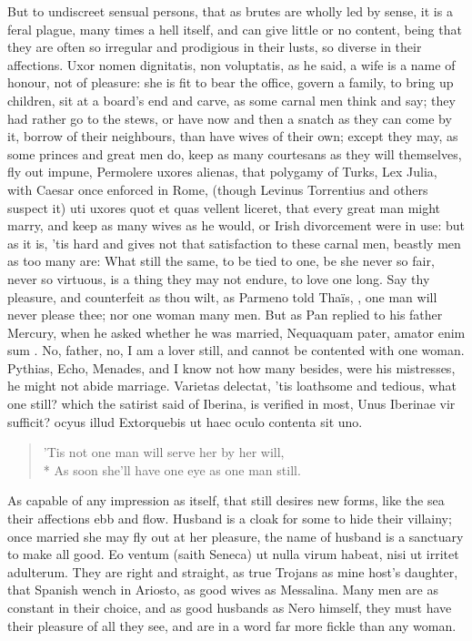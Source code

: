 {But to undiscreet sensual persons, that as brutes are wholly led by
sense, it is a feral plague, many times a hell itself, and can give
little or no content, being that they are often so irregular and
prodigious in their lusts, so diverse in their affections. Uxor nomen
dignitatis, non voluptatis, as he said, a wife is a name of
honour, not of pleasure: she is fit to bear the office, govern a
family, to bring up children, sit at a board's end and carve, as some
carnal men think and say; they had rather go to the stews, or have now
and then a snatch as they can come by it, borrow of their neighbours,
than have wives of their own; except they may, as some princes and
great men do, keep as many courtesans as they will themselves, fly out
impune, Permolere uxores alienas, that polygamy of Turks, Lex
Julia, with Caesar once enforced in Rome, (though Levinus Torrentius
and others suspect it) uti uxores quot et quas vellent liceret, that
every great man might marry, and keep as many wives as he would, or
Irish divorcement were in use: but as it is, 'tis hard and gives not
that satisfaction to these carnal men, beastly men as too many are:
What still the same, to be tied to one, be she never so
fair, never so virtuous, is a thing they may not endure, to love one
long. Say thy pleasure, and counterfeit as thou wilt, as Parmeno
told Thaïs, , one man will never please thee;
nor one woman many men. But as Pan replied to his father Mercury,
when he asked whether he was married, Nequaquam pater, amator enim sum
\etc{}. No, father, no, I am a lover still, and cannot be contented with
one woman. Pythias, Echo, Menades, and I know not how many besides,
were his mistresses, he might not abide marriage. Varietas delectat,
'tis loathsome and tedious, what one still? which the satirist said of
Iberina, is verified in most,
Unus Iberinae vir sufficit? ocyus illud
Extorquebis ut haec oculo contenta sit uno.

\begin{verse}
'Tis not one man will serve her by her will,\\*
As soon she'll have one eye as one man still.
\end{verse}

As capable of any impression as  itself, that still
desires new forms, like the sea their affections ebb and flow. Husband
is a cloak for some to hide their villainy; once married she may fly
out at her pleasure, the name of husband is a sanctuary to make all
good. Eo ventum (saith Seneca) ut nulla virum habeat, nisi ut irritet
adulterum. They are right and straight, as true Trojans as mine host's
daughter, that Spanish wench in Ariosto, as good wives as
Messalina. Many men are as constant in their choice, and as good
husbands as Nero himself, they must have their pleasure of all they
see, and are in a word far more fickle than any woman.

}
